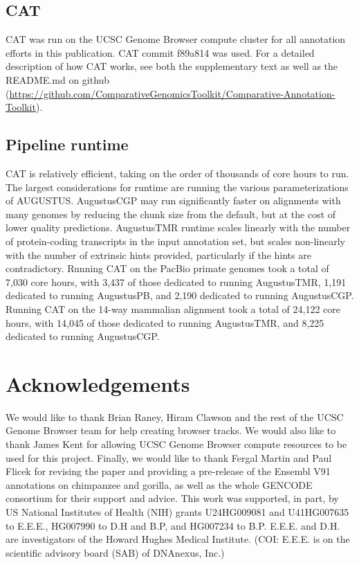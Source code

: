 \documentclass[fleqn,10pt]{wlscirep}
\begin{document}
\subsection*{CAT}

CAT was run on the UCSC Genome Browser compute cluster for all annotation efforts in this publication. CAT commit f89a814 was used. For a detailed description of how CAT works, see both the supplementary text as well as the README.md on github (\url{https://github.com/ComparativeGenomicsToolkit/Comparative-Annotation-Toolkit}). 

\subsection*{Pipeline runtime}

CAT is relatively efficient, taking on the order of thousands of core hours to run. The largest considerations for runtime are running the various parameterizations of AUGUSTUS. AugustusCGP may run significantly faster on alignments with many genomes by reducing the chunk size from the default, but at the cost of lower quality predictions. AugustusTMR runtime scales linearly with the number of protein-coding transcripts in the input annotation set, but scales non-linearly with the number of extrinsic hints provided, particularly if the hints are contradictory. 
Running CAT on the PacBio primate genomes took a total of 7,030 core hours, with 3,437 of those dedicated to running AugustusTMR, 1,191 dedicated to running AugustusPB, and 2,190 dedicated to running AugustusCGP. Running CAT on the 14-way mammalian alignment took a total of 24,122 core hours, with 14,045 of those dedicated to running AugustusTMR, and 8,225 dedicated to running AugustusCGP.

\section*{Acknowledgements}

We would like to thank Brian Raney, Hiram Clawson and the rest of the UCSC Genome Browser team for help creating browser tracks. We would also like to thank James Kent for allowing UCSC Genome Browser compute resources to be used for this project. Finally, we would like to thank Fergal Martin and Paul Flicek for revising the paper and providing a pre-release of the Ensembl V91 annotations on chimpanzee and gorilla, as well as the whole GENCODE consortium for their support and advice. This work was supported, in part, by US National Institutes of Health (NIH) grants U24HG009081 and U41HG007635 to E.E.E., HG007990 to D.H and B.P, and HG007234 to B.P. E.E.E. and D.H. are investigators of the Howard Hughes Medical Institute. (COI: E.E.E. is on the scientific advisory board (SAB) of DNAnexus, Inc.)
\end{document}

